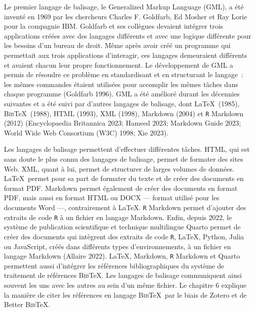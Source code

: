 \documentclass[
  letterpaper,
]{scrbook}
\begin{document}
Le premier langage de balisage, le Generalized Markup Language (GML), a
été inventé en 1969 par les chercheurs Charles F. Goldfarb, Ed Mosher et
Ray Lorie pour la compagnie IBM. Goldfarb et ses collègues devaient
intégrer trois applications créées avec des langages différents et avec
une logique différente pour les besoins d'un bureau de droit. Même après
avoir créé un programme qui permettait aux trois applications
d'interagir, ces langages demeuraient différents et avaient chacun leur
propre fonctionnement. Le développement de GML a permis de résoudre ce
problème en standardisant et en structurant le langage~: les mêmes
commandes étaient utilisées pour accomplir les mêmes tâches dans chaque
programme (Goldfarb 1996). GML a été amélioré durant les décennies
suivantes et a été suivi par d'autres langages de balisage, dont
\LaTeX~(1985), \textsc{Bib}\TeX~(1988), HTML (1993), XML (1998),
Markdown (2004) et \texttt{R} Markdown (2012) (Encyclopaedia Britannica
2023; Hameed 2023; Markdown Guide 2023; World Wide Web Consortium (W3C)
1998; Xie 2023).

Les langages de balisage permettent d'effectuer différentes tâches.
HTML, qui est sans doute le plus connu des langages de balisage, permet
de formater des sites Web. XML, quant à lui, permet de structurer de
larges volumes de données. \LaTeX~permet pour sa part de formater du
texte et de créer des documents en format PDF. Markdown permet également
de créer des documents en format PDF, mais aussi en format HTML ou DOCX
--- format utilisé pour les documents Word ---, contrairement à \LaTeX.
\texttt{R} Markdown permet d'ajouter des extraits de code \texttt{R} à
un fichier en langage Markdown. Enfin, depuis 2022, le système de
publication scientifique et technique multilingue Quarto permet de créer
des documents qui intègrent des extraits de code \texttt{R}, \LaTeX,
Python, Julia ou JavaScript, créés dans différents types
d'environnements, à un fichier en langage Markdown (Allaire 2022).
\LaTeX, Markdown, \texttt{R} Markdown et Quarto permettent aussi
d'intégrer les références bibliographiques du système de traitement de
références \textsc{Bib}\TeX. Les langages de balisage communiquent ainsi
souvent les uns avec les autres au sein d'un même fichier. Le chapitre 6
explique la manière de citer les références en langage
\textsc{Bib}\TeX~par le biais de Zotero et de Better \textsc{Bib}\TeX.
\end{document}
